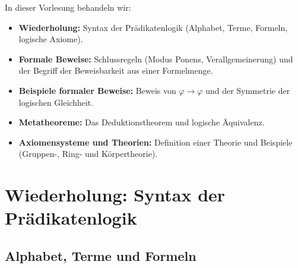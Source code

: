 


\begin{nice-box}[Agenda]
In dieser Vorlesung behandeln wir:
\begin{itemize}
    \item \textbf{Wiederholung:} Syntax der Prädikatenlogik (Alphabet, Terme, Formeln, logische Axiome).
    \item \textbf{Formale Beweise:} Schlussregeln (Modus Ponens, Verallgemeinerung) und der Begriff der Beweisbarkeit aus einer Formelmenge.
    \item \textbf{Beispiele formaler Beweise:} Beweis von $\varphi \to \varphi$ und der Symmetrie der logischen Gleichheit.
    \item \textbf{Metatheoreme:} Das Deduktionstheorem und logische Äquivalenz.
    \item \textbf{Axiomensysteme und Theorien:} Definition einer Theorie und Beispiele (Gruppen-, Ring- und Körpertheorie).
\end{itemize}
\end{nice-box}

\section{Wiederholung: Syntax der Prädikatenlogik}
\subsection{Alphabet, Terme und Formeln}

